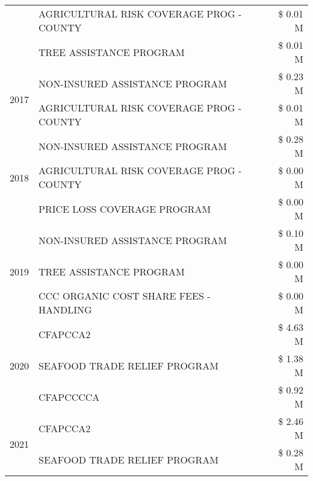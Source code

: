 \begin{tabular}{llr}
 & AGRICULTURAL RISK COVERAGE PROG - COUNTY & \$ 0.01 M \\
 & TREE ASSISTANCE PROGRAM & \$ 0.01 M \\
\cline{1-3}
\multirow[t]{2}{*}{2017} & NON-INSURED ASSISTANCE PROGRAM & \$ 0.23 M \\
 & AGRICULTURAL RISK COVERAGE PROG - COUNTY & \$ 0.01 M \\
\cline{1-3}
\multirow[t]{3}{*}{2018} & NON-INSURED ASSISTANCE PROGRAM & \$ 0.28 M \\
 & AGRICULTURAL RISK COVERAGE PROG - COUNTY & \$ 0.00 M \\
 & PRICE LOSS COVERAGE PROGRAM & \$ 0.00 M \\
\cline{1-3}
\multirow[t]{3}{*}{2019} & NON-INSURED ASSISTANCE PROGRAM & \$ 0.10 M \\
 & TREE ASSISTANCE PROGRAM & \$ 0.00 M \\
 & CCC ORGANIC COST SHARE FEES - HANDLING & \$ 0.00 M \\
\cline{1-3}
\multirow[t]{3}{*}{2020} & CFAPCCA2 & \$ 4.63 M \\
 & SEAFOOD TRADE RELIEF PROGRAM & \$ 1.38 M \\
 & CFAPCCCCA & \$ 0.92 M \\
\cline{1-3}
\multirow[t]{2}{*}{2021} & CFAPCCA2 & \$ 2.46 M \\
 & SEAFOOD TRADE RELIEF PROGRAM & \$ 0.28 M \\
\cline{1-3}
\bottomrule
\end{tabular}
